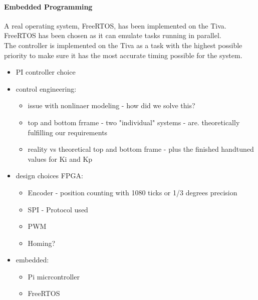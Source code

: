 \documentclass[../../main]{subfiles}
\begin{document}
\paragraph{Embedded Programming}
A real operating system, FreeRTOS, has been implemented on the Tiva. FreeRTOS has been chosen as it can emulate tasks running in parallel. \\
The controller is implemented on the Tiva as a task with the highest possible priority to make sure it has the most accurate timing possible for the system.

\begin{itemize}
  \item PI controller choice
  \item control engineering:
  \begin{itemize}
    \item issue with nonlinaer modeling - how did we solve this?
    \item top and bottom frrame - two "individual" systems - are. theoretically fulfilling our requirements
    \item reality vs theoretical top and bottom frame - plus the finished handtuned values for Ki and Kp
  \end{itemize}
  \item design choices FPGA:
    \begin{itemize}
      \item Encoder - position counting with 1080 ticks or 1/3 degrees precision
      \item SPI - Protocol used
      \item PWM
      \item Homing?
    \end{itemize}
  \item embedded:
  \begin{itemize}
    \item Pi micrcontroller
    \item FreeRTOS
  \end{itemize}


\end{itemize}
\end{document}
